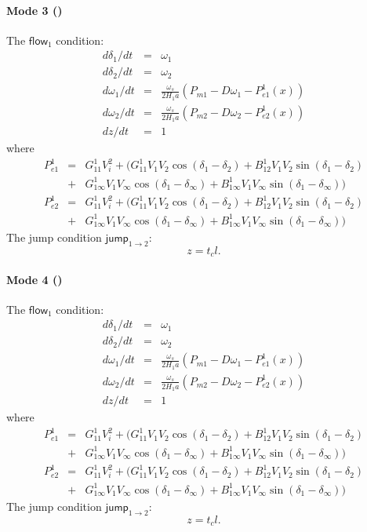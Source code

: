 \documentclass{article}
\newcommand{\flow}{\mathsf{flow}}
\newcommand{\jump}{\mathsf{jump}}
\begin{document}
\paragraph{Mode 3 ()}
The $\flow_1$ condition:
\begin{eqnarray*}
d\delta_1/dt &=& \omega_1\\
d\delta_2/dt &=& \omega_2\\
d\omega_1/dt &=& \frac{\omega_s}{2H_1a}(P_{m1} - D\omega_1 - P_{e1}^1(x))\\
d\omega_2/dt &=& \frac{\omega_s}{2H_1a}(P_{m2} - D\omega_2 - P_{e2}^1(x))\\
dz/dt &=& 1
\end{eqnarray*}
where
\begin{eqnarray*}
P_{e1}^1 &=& G_{11}^1V_i^2 + \Big(G_{11}^1 V_1V_2\cos(\delta_1-\delta_2) +
B_{12}^1 V_1V_2\sin(\delta_1-\delta_2)\\
&+& G_{1\infty}^1
V_1V_{\infty}\cos(\delta_1-\delta_{\infty}) + B_{1\infty}^1
V_1V_{\infty}\sin(\delta_1-\delta_{\infty}) \Big)\\
P_{e2}^1 &=& G_{11}^1V_i^2 + \Big(G_{11}^1 V_1V_2\cos(\delta_1-\delta_2) +
B_{12}^1 V_1V_2\sin(\delta_1-\delta_2)\\
&+& G_{1\infty}^1
V_1V_{\infty}\cos(\delta_1-\delta_{\infty}) + B_{1\infty}^1
V_1V_{\infty}\sin(\delta_1-\delta_{\infty}) \Big)
\end{eqnarray*}
The jump condition $\jump_{1 \rightarrow 2}:$
$$z = t_cl.$$


\paragraph{Mode 4 ()}
The $\flow_1$ condition:
\begin{eqnarray*}
d\delta_1/dt &=& \omega_1\\
d\delta_2/dt &=& \omega_2\\
d\omega_1/dt &=& \frac{\omega_s}{2H_1a}(P_{m1} - D\omega_1 - P_{e1}^1(x))\\
d\omega_2/dt &=& \frac{\omega_s}{2H_1a}(P_{m2} - D\omega_2 - P_{e2}^1(x))\\
dz/dt &=& 1
\end{eqnarray*}
where
\begin{eqnarray*}
P_{e1}^1 &=& G_{11}^1V_i^2 + \Big(G_{11}^1 V_1V_2\cos(\delta_1-\delta_2) +
B_{12}^1 V_1V_2\sin(\delta_1-\delta_2)\\
&+& G_{1\infty}^1
V_1V_{\infty}\cos(\delta_1-\delta_{\infty}) + B_{1\infty}^1
V_1V_{\infty}\sin(\delta_1-\delta_{\infty}) \Big)\\
P_{e2}^1 &=& G_{11}^1V_i^2 + \Big(G_{11}^1 V_1V_2\cos(\delta_1-\delta_2) +
B_{12}^1 V_1V_2\sin(\delta_1-\delta_2)\\
&+& G_{1\infty}^1
V_1V_{\infty}\cos(\delta_1-\delta_{\infty}) + B_{1\infty}^1
V_1V_{\infty}\sin(\delta_1-\delta_{\infty}) \Big)
\end{eqnarray*}
The jump condition $\jump_{1 \rightarrow 2}:$
$$z = t_cl.$$
\end{document}
